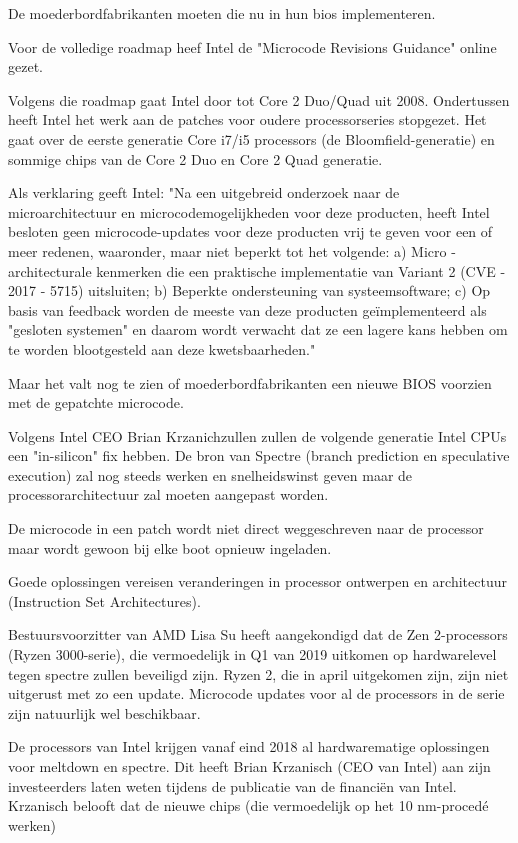 De moederbordfabrikanten moeten die nu in hun bios implementeren.

Voor de volledige roadmap heef Intel de "Microcode Revisions Guidance" online gezet.

Volgens die roadmap gaat Intel door tot Core 2 Duo/Quad uit 2008.
Ondertussen heeft Intel het werk aan de patches voor oudere processorseries stopgezet.
Het gaat over de eerste generatie Core i7/i5 processors (de Bloomfield-generatie) en sommige chips van de Core 2 Duo en Core 2 Quad generatie.


Als verklaring geeft Intel: "Na een uitgebreid onderzoek naar de microarchitectuur en microcodemogelijkheden voor deze producten, heeft Intel besloten geen microcode-updates voor deze producten vrij te geven voor een of meer redenen, waaronder, maar niet beperkt tot het volgende:
a) Micro - architecturale kenmerken die een praktische implementatie van Variant 2 (CVE - 2017 - 5715) uitsluiten;
b) Beperkte ondersteuning van systeemsoftware;
c) Op basis van feedback worden de meeste van deze producten geïmplementeerd als "gesloten systemen" en daarom wordt verwacht dat ze een lagere kans hebben om te worden blootgesteld aan deze kwetsbaarheden." \parencite{Intel2018a}


Maar het valt nog te zien of moederbordfabrikanten een nieuwe BIOS voorzien met de gepatchte microcode.

Volgens Intel CEO Brian Krzanichzullen zullen de volgende generatie Intel CPUs een "in-silicon" fix hebben. De bron van Spectre (branch prediction en speculative execution) zal nog steeds werken en snelheidswinst geven maar de processorarchitectuur zal moeten aangepast worden.

De microcode in een patch wordt niet direct weggeschreven naar de processor maar wordt gewoon bij elke boot opnieuw ingeladen.

Goede oplossingen vereisen veranderingen in processor ontwerpen en architectuur (Instruction Set Architectures).

Bestuursvoorzitter van AMD Lisa Su heeft aangekondigd dat de Zen 2-processors (Ryzen 3000-serie), die vermoedelijk in Q1 van 2019 uitkomen op hardwarelevel tegen spectre zullen beveiligd zijn. Ryzen 2, die in april uitgekomen zijn, zijn niet uitgerust met zo een update. Microcode updates voor al de processors in de serie zijn natuurlijk wel beschikbaar.

De processors van Intel krijgen vanaf eind 2018 al hardwarematige oplossingen voor meltdown en spectre.
Dit heeft Brian Krzanisch (CEO van Intel) aan zijn investeerders laten weten tijdens de publicatie van de financiën van Intel. Krzanisch belooft dat de nieuwe chips (die vermoedelijk op het 10 nm-procedé werken)

